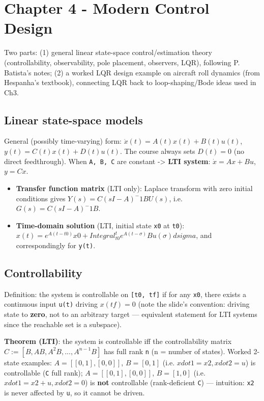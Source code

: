 \documentclass[11pt]{article}
\begin{document}
\section{Chapter 4 - Modern Control Design}

Two parts: (1) general linear state-space control/estimation theory (controllability, observability, pole placement, observers, LQR), following P. Batista's notes; (2) a worked LQR design example on aircraft roll dynamics (from Hespanha's textbook), connecting LQR back to loop-shaping/Bode ideas used in Ch3.

\subsection{Linear state-space models}
General (possibly time-varying) form: $\dot{x}(t) = A(t)x(t) + B(t)u(t)$, $y(t) = C(t)x(t) + D(t)u(t)$. The course always sets $D(t) = 0$ (no direct feedthrough). When \texttt{A, B, C} are constant -> \textbf{LTI system}: $\dot{x} = Ax + Bu$, $y = Cx$.

\begin{itemize}
\item \textbf{Transfer function matrix} (LTI only): Laplace transform with zero initial conditions gives $Y(s) = C(sI-A)^-1 B U(s)$, i.e. $G(s) = C(sI-A)^-1 B$.
\item \textbf{Time-domain solution} (LTI, initial state \texttt{x0} at \texttt{t0}): $x(t) = e^{A(t-t0)} x0 + Integral_{t0}^{t} e^{A(t-\sigma)} B u(\sigma) dsigma$, and correspondingly for \texttt{y(t)}.
\end{itemize}

\subsection{Controllability}
Definition: the system is controllable on \texttt{[t0, tf]} if for any \texttt{x0}, there exists a continuous input \texttt{u(t)} driving $x(tf) = 0$ (note the slide's convention: driving state to \textbf{zero}, not to an arbitrary target — equivalent statement for LTI systems since the reachable set is a subspace).

\textbf{Theorem (LTI)}: the system is controllable iff the controllability matrix $C := [B, AB, A^2 B, ..., A^{n-1} B]$ has full rank \texttt{n} (n = number of states).
Worked 2-state examples: $A=[[0,1],[0,0]]$, $B=[0,1]$ (i.e. $xdot1=x2, xdot2=u$) is controllable (\texttt{C} full rank); $A=[[0,1],[0,0]]$, $B=[1,0]$ (i.e. $xdot1 = x2+u, xdot2=0$) is \textbf{not} controllable (rank-deficient \texttt{C}) — intuition: \texttt{x2} is never affected by \texttt{u}, so it cannot be driven.
\end{document}

